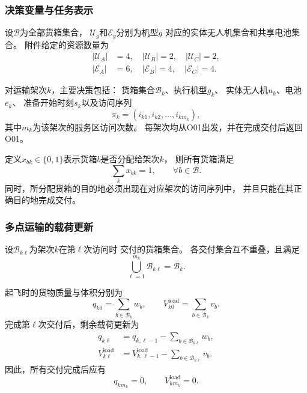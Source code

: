 \documentclass[bwprint]{gmcmthesis}
\begin{document}
\subsubsection{决策变量与任务表示}

设$\mathcal{B}$为全部货箱集合，
$\mathcal{U}_g$和$\mathcal{E}_g$分别为机型$g$
对应的实体无人机集合和共享电池集合。
附件给定的资源数量为
\begin{equation}
\begin{aligned}
    |\mathcal{U}_A|&=4,\quad
    |\mathcal{U}_B|=2,\quad
    |\mathcal{U}_C|=2,\\
    |\mathcal{E}_A|&=6,\quad
    |\mathcal{E}_B|=4,\quad
    |\mathcal{E}_C|=4.
\end{aligned}
\end{equation}

对运输架次$k$，主要决策包括：
货箱集合$\mathcal{B}_k$、执行机型$g_k$、
实体无人机$u_k$、电池$e_k$、
准备开始时刻$s_k$以及访问序列
\begin{equation}
    \pi_k=(i_{k1},i_{k2},\ldots,i_{km_k}),
\end{equation}
其中$m_k$为该架次的服务区访问次数。
每架次均从O01出发，并在完成交付后返回O01。

定义$x_{bk}\in\{0,1\}$表示货箱$b$是否分配给架次$k$，
则所有货箱满足
\begin{equation}
    \sum_k x_{bk}=1,
    \qquad \forall b\in\mathcal{B}.
    \label{eq:q2_box_once}
\end{equation}
同时，所分配货箱的目的地必须出现在对应架次的访问序列中，
并且只能在其正确目的地完成交付。

\subsubsection{多点运输的载荷更新}

设$\mathcal{B}_{k\ell}$为架次$k$在第$\ell$次访问时
交付的货箱集合。
各交付集合互不重叠，且满足
\begin{equation}
    \bigcup_{\ell=1}^{m_k}\mathcal{B}_{k\ell}
    =
    \mathcal{B}_k.
\end{equation}

起飞时的货物质量与体积分别为
\begin{equation}
    q_{k0}=\sum_{b\in\mathcal{B}_k}w_b,
    \qquad
    V_{k0}^{\mathrm{load}}
    =
    \sum_{b\in\mathcal{B}_k}v_b.
\end{equation}
完成第$\ell$次交付后，剩余载荷更新为
\begin{align}
    q_{k\ell}
    &=
    q_{k,\ell-1}
    -
    \sum_{b\in\mathcal{B}_{k\ell}}w_b,\\
    V_{k\ell}^{\mathrm{load}}
    &=
    V_{k,\ell-1}^{\mathrm{load}}
    -
    \sum_{b\in\mathcal{B}_{k\ell}}v_b.
\end{align}
因此，所有交付完成后应有
\begin{equation}
    q_{km_k}=0,
    \qquad
    V_{km_k}^{\mathrm{load}}=0.
\end{equation}
\end{document}
